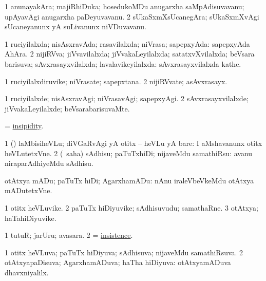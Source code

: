 \bentry
{}
\gl{\nA}
\bmng
\bnum
\num{1} anunayakAra; majiRhiDuka; hosedukoMDu anugarxha saMpAdisuvavanu; upAyavAgi anugarxha paDeyuvavanu. 
\num{2} sUkaSxmXsUcanegAra; sUkaSxmXvAgi sUcaneyanunx yA suLivanunx niVDuvavanu. 
\enum
\emng
\eentry

\bentry
{}
\gl{\gu}
\bmng
\bnum
\num{1} ruciyilalxda; nisAsxravAda; rasavilalxda; niVrasa; sapepxyAda:  sapepxyAda AhAra. 
\num{2} nijiRVva; jiVvavilalxda; jiVvakaLeyilalxda; satatxvXvilalxda; beVsara barisuva; sAvxrasayxvilalxda; lavalavikeyilalxda:  sAvxrasayxvilalxda kathe. 
\enum
\emng
\eentry

\bentry
{}
\gl{\nA}
\bmng
\bnum
\num{1} ruciyilalxdiruvike; niVrasate; sapepxtana. 
\num{2} nijiRVvate; asAvxrasayx. 
\enum
\emng
\eentry

\bentry
{}
\gl{\kirxvi}
\bmng
\bnum
\num{1} ruciyilalxde; nisAsxravAgi; niVrasavAgi; sapepxyAgi. 
\num{2} sAvxrasayxvilalxde; jiVvakaLeyilalxde; beVsarabarisuvaMte. 
\enum
\emng
\eentry

\bentry
{}
\gl{\nA}
\bmng
= \hyperlink{insipidity}{insipidity}. 
\emng
\eentry

\bentry
{}
\gl{\akirx}
\bmng
\bnum
\num{1} (\pArxparx) laMbisiheVLu; diVGaRvAgi yA otitx -- heVLu yA bare:  I aMshavanunx otitx heVLutetxVne. 
\num{2} (\sakirx\ saha) sAdhisu; paTuTxhiDi; nijaveMdu samathiRsu:  avanu niraparAdhiyeMdu sAdhisu. 
\enum
\emng

\noindent 
\gl{\nuga}
\bmng
{} otAtxya mADu; paTuTx hiDi; AgarxhamADu:  nAnu iraleVbeVkeMdu otAtxya mADutetxVne. 
\emng
\eentry

\bentry
{}
\gl{\nA}
\bmng
\bnum
\num{1} otitx heVLuvike. 
\num{2} paTuTx hiDiyuvike; sAdhisuvudu; samathaRne. 
\num{3} otAtxya; haTa{hi}Diyuvike. 
\enum
\emng
\eentry

\bentry
{}
\gl{\nA}
\bmng
\bnum
\num{1} tutuR; jarUru; avasara. 
\num{2} = \hyperlink{insistence}{insistence}. 
\enum
\emng
\eentry

\bentry
{}
\gl{\gu}
\bmng
\bnum
\num{1} otitx heVLuva; paTuTx hiDiyuva; sAdhisuva; nijaveMdu samathiRsuva. 
\num{2} otAtxyapaDisuva; AgarxhamADuva; haTha hiDiyuva:  otAtxyamADuva dhavxniyalilx. 
\enum
\emng
\eentry

